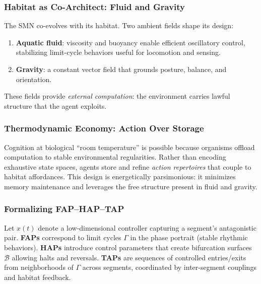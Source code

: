\subsubsection{Habitat as Co-Architect: Fluid and Gravity}
\label{subsec:habitat}
The SMN co-evolves with its habitat. Two ambient fields shape its design:
\begin{enumerate}
    \item \textbf{Aquatic fluid}: viscosity and buoyancy enable efficient oscillatory control, 
    stabilizing limit-cycle behaviors useful for locomotion and sensing.
    \item \textbf{Gravity}: a constant vector field that grounds posture, balance, and orientation.
\end{enumerate}
These fields provide \emph{external computation}: the environment carries lawful structure that the agent exploits.

\subsubsection{Thermodynamic Economy: Action Over Storage}
Cognition at biological ``room temperature'' is possible because organisms offload computation to stable environmental regularities. 
Rather than encoding exhaustive state spaces, agents store and refine \emph{action repertoires} that couple to habitat affordances. 
This design is energetically parsimonious: it minimizes memory maintenance and leverages the free structure present in fluid and gravity.

\subsubsection{Formalizing FAP--HAP--TAP}
Let $x(t)$ denote a low-dimensional controller capturing a segment's antagonistic pair. 
\textbf{FAPs} correspond to limit cycles $\Gamma$ in the phase portrait (stable rhythmic behaviors). 
\textbf{HAPs} introduce control parameters that create bifurcation surfaces $\mathcal{B}$ allowing halts and reversals. 
\textbf{TAPs} are sequences of controlled entries/exits from neighborhoods of $\Gamma$ across segments, 
coordinated by inter-segment couplings and habitat feedback. 





